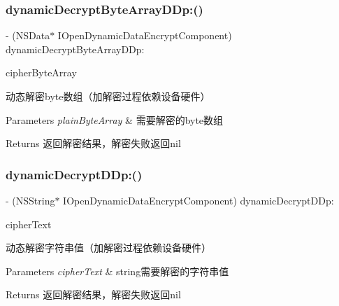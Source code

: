 \subsubsection{\texorpdfstring{dynamic\+Decrypt\+Byte\+Array\+D\+Dp\+:()}{dynamicDecryptByteArrayDDp:()}}
{\footnotesize\ttfamily -\/ (N\+S\+Data$\ast$ I\+Open\+Dynamic\+Data\+Encrypt\+Component) dynamic\+Decrypt\+Byte\+Array\+D\+Dp\+: \begin{DoxyParamCaption}\item[{(N\+S\+Data $\ast$)}]{cipher\+Byte\+Array }\end{DoxyParamCaption}}

动态解密byte数组（加解密过程依赖设备硬件）


\begin{DoxyParams}{Parameters}
{\em plain\+Byte\+Array} & 需要解密的byte数组\\
\hline
\end{DoxyParams}
\begin{DoxyReturn}{Returns}
返回解密结果，解密失败返回nil 
\end{DoxyReturn}
\mbox{\label{protocol_i_open_dynamic_data_encrypt_component_01-p_a9efd30d160d5b6a2a8006686dd44a88a}} 
\subsubsection{\texorpdfstring{dynamic\+Decrypt\+D\+Dp\+:()}{dynamicDecryptDDp:()}}
{\footnotesize\ttfamily -\/ (N\+S\+String$\ast$ I\+Open\+Dynamic\+Data\+Encrypt\+Component) dynamic\+Decrypt\+D\+Dp\+: \begin{DoxyParamCaption}\item[{(N\+S\+String $\ast$)}]{cipher\+Text }\end{DoxyParamCaption}}

动态解密字符串值（加解密过程依赖设备硬件）


\begin{DoxyParams}{Parameters}
{\em cipher\+Text} & string需要解密的字符串值\\
\hline
\end{DoxyParams}
\begin{DoxyReturn}{Returns}
返回解密结果，解密失败返回nil 
\end{DoxyReturn}
\mbox{\label{protocol_i_open_dynamic_data_encrypt_component_01-p_a673a3c7262b0df36b23f1f87de4b88f7}} 
